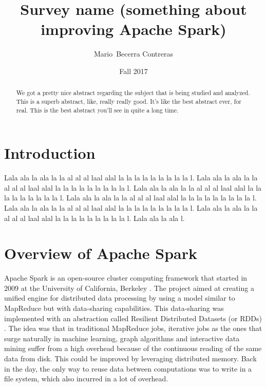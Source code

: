 \documentclass{article}
\begin{document}

\title{Survey name (something about improving Apache Spark)}

\author{Mario~Becerra Contreras}

\date{Fall 2017}


\maketitle

\begin{abstract}

We got a pretty nice abstract regarding the subject that is being studied and analyzed. This is a superb abstract, like, really really good. It's like the best abstract ever, for real. This is the best abstract you'll see in quite a long time.

\end{abstract}

\section{Introduction}

Lala ala la ala la la al al al laal alal la la la la la la la la la l. Lala ala la ala la la al al al laal alal la la la la la la la la la l. Lala ala la ala la la al al al laal alal la la la la la la la la la l. Lala ala la ala la la al al al laal alal la la la la la la la la la l. Lala ala la ala la la al al al laal alal la la la la la la la la la l. Lala ala la ala la la al al al laal alal la la la la la la la la la l. Lala ala la ala l. 


\section{Overview of Apache Spark}

Apache Spark \cite{zaharia_spark:_2010} is an open-source cluster computing framework that started in 2009 at the University of California, Berkeley \cite{zaharia_apache_2016}. The project aimed at creating a unified engine for distributed data processing by using a model similar to MapReduce but with data-sharing capabilities. This data-sharing was implemented with an abstraction called Resilient Distributed Datasets (or RDDs) \cite{zaharia_resilient_2012}. The idea was that in traditional MapReduce jobs, iterative jobs as the ones that surge naturally in machine learning, graph algorithms and interactive data mining suffer from a high overhead because of the continuous reading of the same data from disk. This could be improved by leveraging distributed memory. Back in the day, the only way to reuse data between computations was to write in a file system, which also incurred in a lot of overhead. 
\end{document}
